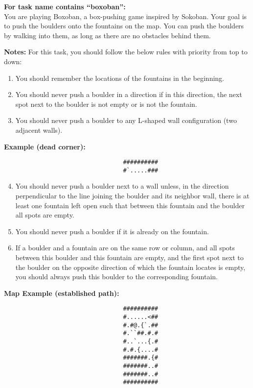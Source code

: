 \begin{MyGreenBox}
	\textbf{For task name contains “boxoban”:}\\ You are playing Boxoban, a box-pushing
	game inspired by Sokoban. Your goal is to push the boulders onto the fountains
	on the map. You can push the boulders by walking into them, as long as there are
	no obstacles behind them.

	\textbf{Notes:} For this task, you should follow the below rules with priority
	from top to down:
	\begin{enumerate}
		\item You should remember the locations of the fountains in the beginning.

		\item You should never push a boulder in a direction if in this direction,
			the next spot next to the boulder is not empty or is not the fountain.

		\item You should never push a boulder to any L-shaped wall configuration (two
			adjacent walls).
	\end{enumerate}

	\textbf{Example (dead corner):}
	\begin{verbatim}
                                  ##########
                                  #`.....###
\end{verbatim}

	\begin{enumerate}
		\setcounter{enumi}{3}

		\item You should never push a boulder next to a wall unless, in the
			direction perpendicular to the line joining the boulder and its neighbor
			wall, there is at least one fountain left open such that between this fountain
			and the boulder all spots are empty.

		\item You should never push a boulder if it is already on the fountain.

		\item If a boulder and a fountain are on the same row or column, and all
			spots between this boulder and this fountain are empty, and the first spot
			next to the boulder on the opposite direction of which the fountain locates
			is empty, you should always push this boulder to the corresponding
			fountain.
	\end{enumerate}

	\textbf{Map Example (established path):} \begin{verbatim}
                                  ##########
                                  #......<##
                                  #.#@.{`.##
                                  #.``##.#.#
                                  #..`...{.#
                                  #.#.{....#
                                  #######.{#
                                  #######..#
                                  #######..#
                                  ##########
\end{verbatim}


\end{MyGreenBox}
